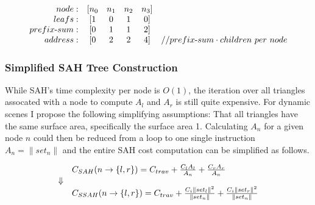 \begin{displaymath}
  \begin{array}{r c c c c l}
    node: & [n_0 & n_1 & n_2 & n_3]\\
    leafs: & [1 & 0 & 1 & 0]\\
    prefix\text{-}sum: & [0 & 1 & 1 & 2]\\
    address: & [0 & 2 & 2 & 4] & // prefix\text{-}sum \cdot children\text{ }per\text{ } node\\
  \end{array}
\end{displaymath}



\subsubsection{Simplified SAH Tree Construction}


While SAH's time complexity per node is $O(1)$, the iteration over all triangles
assocated with a node to compute $A_l$ and $A_r$ is still quite expensive. For
dynamic scenes I propose the following simplifying assumptions: That all
triangles have the same surface area, specifically the surface area
1. Calculating $A_n$ for a given node $n$ could then be reduced from a loop to
one single instruction $A_n = \|set_n\|$ and the entire SAH cost computation can
be simplified as follows.

\begin{displaymath}
  \begin{array}{r l}
    & C_{SAH}(n \rightarrow \{l, r\}) = C_{trav} + \frac{C_l A_l}{A_n} + \frac{C_r
      A_r}{A_n}\\
    \Downarrow \\
    & C_{SSAH}(n \rightarrow \{l, r\}) = C_{trav} +
    \frac{C_i \|set_l\|^2}{\|set_n\|} + \frac{C_i \|set_r\|^2}{\|set_n\|}\\
  \end{array}
\end{displaymath}


